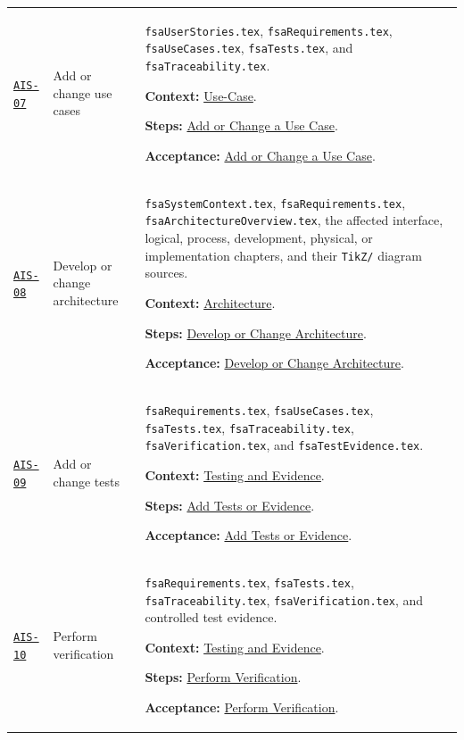\begin{tabularx}{\linewidth}{L{1.6cm}L{3.1cm}Y}
\label{Skill:AIS-07}\hyperref[Section:AIUseCaseSteps]{\texttt{AIS-07}} & Add or change use cases & \texttt{fsaUserStories.tex}, \texttt{fsaRequirements.tex}, \texttt{fsaUseCases.tex}, \texttt{fsaTests.tex}, and \texttt{fsaTraceability.tex}.\par\textbf{Context:} \hyperref[Section:AIUseCaseContext]{Use-Case}.\par\textbf{Steps:} \hyperref[Section:AIUseCaseTaskSteps]{Add or Change a Use Case}.\par\textbf{Acceptance:} \hyperref[Section:AIUseCaseAcceptance]{Add or Change a Use Case}.\\
\label{Skill:AIS-08}\hyperref[Section:AIArchitectureSteps]{\texttt{AIS-08}} & Develop or change architecture & \texttt{fsaSystemContext.tex}, \texttt{fsaRequirements.tex}, \texttt{fsaArchitectureOverview.tex}, the affected interface, logical, process, development, physical, or implementation chapters, and their \texttt{TikZ/} diagram sources.\par\textbf{Context:} \hyperref[Section:AIArchitectureContext]{Architecture}.\par\textbf{Steps:} \hyperref[Section:AIArchitectureTaskSteps]{Develop or Change Architecture}.\par\textbf{Acceptance:} \hyperref[Section:AIArchitectureAcceptance]{Develop or Change Architecture}.\\
\label{Skill:AIS-09}\hyperref[Section:AITestSteps]{\texttt{AIS-09}} & Add or change tests & \texttt{fsaRequirements.tex}, \texttt{fsaUseCases.tex}, \texttt{fsaTests.tex}, \texttt{fsaTraceability.tex}, \texttt{fsaVerification.tex}, and \texttt{fsaTestEvidence.tex}.\par\textbf{Context:} \hyperref[Section:AITestingContext]{Testing and Evidence}.\par\textbf{Steps:} \hyperref[Section:AITestTaskSteps]{Add Tests or Evidence}.\par\textbf{Acceptance:} \hyperref[Section:AITestAcceptance]{Add Tests or Evidence}.\\
\label{Skill:AIS-10}\hyperref[Section:AIVerificationSteps]{\texttt{AIS-10}} & Perform verification & \texttt{fsaRequirements.tex}, \texttt{fsaTests.tex}, \texttt{fsaTraceability.tex}, \texttt{fsaVerification.tex}, and controlled test evidence.\par\textbf{Context:} \hyperref[Section:AITestingContext]{Testing and Evidence}.\par\textbf{Steps:} \hyperref[Section:AIVerificationTaskSteps]{Perform Verification}.\par\textbf{Acceptance:} \hyperref[Section:AIVerificationAcceptance]{Perform Verification}.\\

\end{tabularx}

